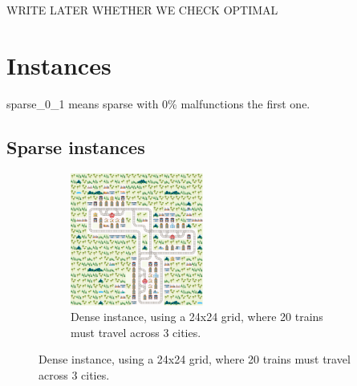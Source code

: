 \documentclass[runningheads]{llncs}
\begin{document}
WRITE LATER WHETHER WE CHECK OPTIMAL



\section{Instances}



sparse\_0\_1 means sparse with 0\% malfunctions the first one.
\subsection{Sparse instances}


\begin{figure}	
	\begin{minipage}{.41\textwidth}
		\begin{subfigure}{\textwidth}
			\centering
			\includegraphics[width=0.48\textwidth]{dense/dense_0_1}
			\caption{Dense instance, using a 24x24 grid, where 20 trains must travel across 3 cities.}
			\label{dense_0_1}
		\end{subfigure}
	\hfill


\end{minipage}
\end{figure}
\end{document}

